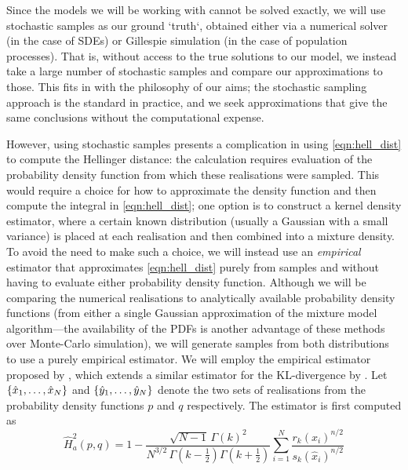 Since the models we will be working with cannot be solved exactly, we will use stochastic samples as our ground `truth`, obtained either via a numerical solver (in the case of SDEs) or Gillespie simulation (in the case of population processes).
That is, without access to the true solutions to our model, we instead take a large number of stochastic samples and compare our approximations to those.
This fits in with the philosophy of our aims; the stochastic sampling approach is the standard in practice, and we seek approximations that give the same conclusions without the computational expense.

However, using stochastic samples presents a complication in using \cref{eqn:hell_dist} to compute the Hellinger distance: the calculation requires evaluation of the probability density function from which these realisations were sampled.
This would require a choice for how to approximate the density function and then compute the integral in \cref{eqn:hell_dist}; one option is to construct a kernel density estimator, where a certain known distribution (usually a Gaussian with a small variance) is placed at each realisation and then combined into a mixture density.
To avoid the need to make such a choice, we will instead use an \emph{empirical} estimator that approximates \cref{eqn:hell_dist} purely from samples and without having to evaluate either probability density function.
Although we will be comparing the numerical realisations to analytically available probability density functions (from either a single Gaussian approximation of the mixture model algorithm---the availability of the PDFs is another advantage of these methods over Monte-Carlo simulation), we will generate samples from both distributions to use a purely empirical estimator.
We will employ the empirical estimator proposed by \citet{DingMullhaupt_2023_EmpiricalSquaredHellinger}, which extends a similar estimator for the KL-divergence by \citet{Perez-Cruz_2008_KullbackLeiblerDivergenceEstimation}. %
Let \(\set{\hat{x}_1, \dotsc, \hat{x}_N}\) and \(\set{\hat{y}_1, \dotsc, \hat{y}_N}\) denote the two sets of realisations from the probability density functions \(p\) and \(q\) respectively.
The estimator is first computed as
\begin{equation}\label{eqn:hell_emp_Ha}
	\hat{H}_a^2\!\left(p, q\right) = 1 - \frac{\sqrt{N - 1}\,\Gamma\!\left(k\right)^2}{N^{3/2}\,\Gamma\!\left(k - \frac12\right)\Gamma\!\left(k + \frac12\right)} \sum_{i=1}^{N}\frac{r_k\!\left(x_i\right)^{n/2}}{s_k\!\left(\hat{x}_i\right)^{n/2}}
\end{equation}
